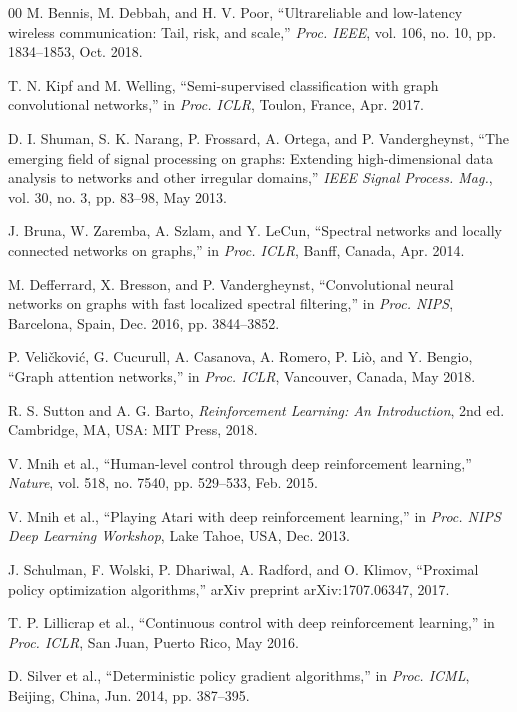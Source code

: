 \begin{thebibliography}{00}
M. Bennis, M. Debbah, and H. V. Poor, ``Ultrareliable and low-latency wireless communication: Tail, risk, and scale,'' \emph{Proc. IEEE}, vol. 106, no. 10, pp. 1834--1853, Oct. 2018.

T. N. Kipf and M. Welling, ``Semi-supervised classification with graph convolutional networks,'' in \emph{Proc. ICLR}, Toulon, France, Apr. 2017.

D. I. Shuman, S. K. Narang, P. Frossard, A. Ortega, and P. Vandergheynst, ``The emerging field of signal processing on graphs: Extending high-dimensional data analysis to networks and other irregular domains,'' \emph{IEEE Signal Process. Mag.}, vol. 30, no. 3, pp. 83--98, May 2013.

J. Bruna, W. Zaremba, A. Szlam, and Y. LeCun, ``Spectral networks and locally connected networks on graphs,'' in \emph{Proc. ICLR}, Banff, Canada, Apr. 2014.

M. Defferrard, X. Bresson, and P. Vandergheynst, ``Convolutional neural networks on graphs with fast localized spectral filtering,'' in \emph{Proc. NIPS}, Barcelona, Spain, Dec. 2016, pp. 3844--3852.

P. Veli\v{c}kovi\'{c}, G. Cucurull, A. Casanova, A. Romero, P. Li\`{o}, and Y. Bengio, ``Graph attention networks,'' in \emph{Proc. ICLR}, Vancouver, Canada, May 2018.

R. S. Sutton and A. G. Barto, \emph{Reinforcement Learning: An Introduction}, 2nd ed. Cambridge, MA, USA: MIT Press, 2018.

V. Mnih et al., ``Human-level control through deep reinforcement learning,'' \emph{Nature}, vol. 518, no. 7540, pp. 529--533, Feb. 2015.

V. Mnih et al., ``Playing Atari with deep reinforcement learning,'' in \emph{Proc. NIPS Deep Learning Workshop}, Lake Tahoe, USA, Dec. 2013.

J. Schulman, F. Wolski, P. Dhariwal, A. Radford, and O. Klimov, ``Proximal policy optimization algorithms,'' arXiv preprint arXiv:1707.06347, 2017.

T. P. Lillicrap et al., ``Continuous control with deep reinforcement learning,'' in \emph{Proc. ICLR}, San Juan, Puerto Rico, May 2016.

D. Silver et al., ``Deterministic policy gradient algorithms,'' in \emph{Proc. ICML}, Beijing, China, Jun. 2014, pp. 387--395.


\end{thebibliography}
